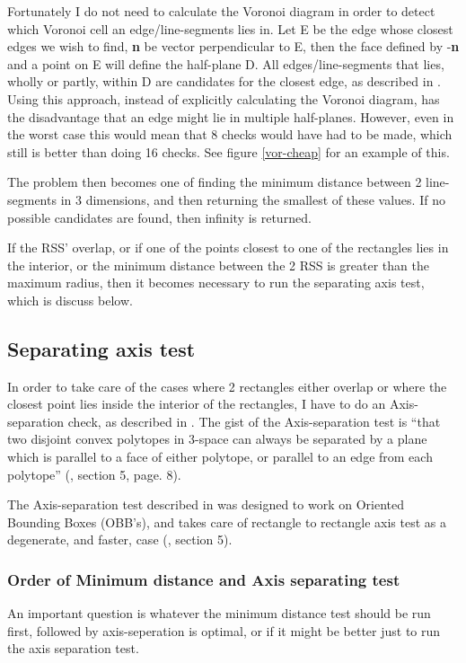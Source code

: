 Fortunately I do not need to calculate the Voronoi diagram in order to detect which Voronoi cell an edge/line-segments lies in. Let E be the edge whose closest edges we wish to find, \textbf{n} be vector perpendicular to E, then the face defined by -\textbf{n} and a point on E will define the half-plane D. All edges/line-segments that lies, wholly or partly, within D are candidates for the closest edge, as described in \cite{larsen00fast}. Using this approach, instead of explicitly calculating the Voronoi diagram, has the disadvantage that an edge might lie in multiple half-planes. However, even in the worst case this would mean that 8 checks would have had to be made, which still is better than doing 16 checks. See figure \ref{vor-cheap} for an example of this.

The problem then becomes one of finding the minimum distance between 2 line-segments in 3 dimensions, and then returning the smallest of these values. If no possible candidates are found, then infinity is returned.

If the RSS' overlap, or if one of the points closest to one of the rectangles lies in the interior, or the minimum distance between the 2 RSS is greater than the maximum radius, then it becomes necessary to run the separating axis test, which is discuss below.

\subsection{Separating axis test}
\label{sepAxis}

In order to take care of the cases where 2 rectangles either overlap or where the closest point lies inside the interior of the rectangles, I have to do an Axis-separation check, as described in \cite{237244}. The gist of the Axis-separation test is ``that two disjoint convex polytopes in 3-space can always be separated by a plane which is parallel to a face of either polytope, or parallel to an edge from each polytope'' (\cite{237244}, section 5, page. 8).

The Axis-separation test described in \cite{237244} was designed to work on Oriented Bounding Boxes (OBB's), and takes care of rectangle to rectangle axis test as a degenerate, and faster, case (\cite{237244}, section 5).

\subsubsection{Order of Minimum distance and Axis separating test}
\label{minAxisOrder}
An important question is whatever the minimum distance test should be run first, followed by axis-seperation is optimal, or if it might be better just to run the axis separation test.

